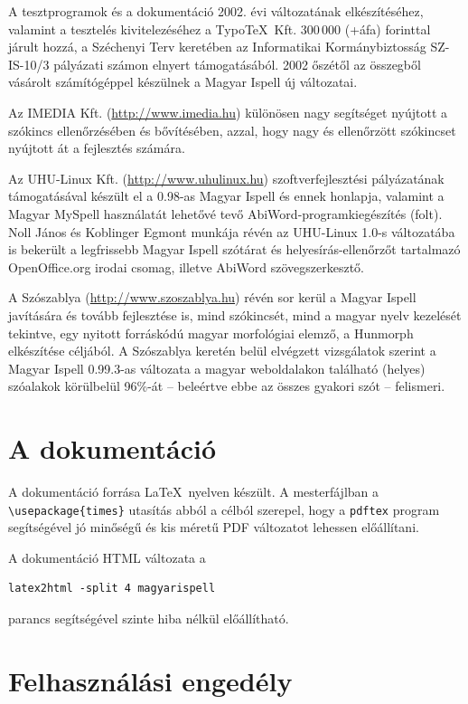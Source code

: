 A tesztprogramok és a dokumentáció 2002. évi változatának
elkészítéséhez, valamint a tesztelés kivitelezéséhez a
Typo\TeX{}\ Kft. 300\,000 (+áfa) forinttal járult hozzá,
a Széchenyi Terv keretében az Informatikai Kormánybiztosság SZ-IS-10/3
pályázati számon elnyert támogatásából. 2002 őszétől az
összegből vásárolt számítógéppel készülnek a Magyar Ispell új változatai.

Az IMEDIA Kft. (\url{http://www.imedia.hu}) különösen nagy segítséget
nyújtott a szókincs ellenőrzésében és bővítésében, azzal, hogy
nagy és ellenőrzött szókincset nyújtott át a fejlesztés számára.

Az UHU-Linux Kft. (\url{http://www.uhulinux.hu}) szoftverfejlesztési pályázatának
támogatásával készült el a 0.98-as Magyar
Ispell és ennek honlapja, valamint a Magyar MySpell használatát lehetővé tevő
AbiWord-programkiegészítés (folt). Noll János és Koblinger Egmont munkája révén az
UHU-Linux 1.0-s változatába is bekerült a legfrissebb Magyar Ispell szótárat és
helyesírás-ellenőrzőt tartalmazó OpenOffice.org irodai csomag, illetve
AbiWord szövegszerkesztő.

A Szószablya (\url{http://www.szoszablya.hu}) révén sor kerül a Magyar
Ispell javítására és tovább fejlesztése is, mind szókincsét, mind a magyar nyelv
kezelését tekintve, egy nyitott forráskódú magyar morfológiai elemző, a Hunmorph
elkészítése céljából. A Szószablya keretén belül elvégzett vizsgálatok szerint
a Magyar Ispell 0.99.3-as változata a magyar weboldalakon található (helyes)
szóalakok körülbelül 96\%-át -- beleértve ebbe az összes gyakori
szót -- felismeri.

\section{A dokumentáció}

A dokumentáció forrása \LaTeX\ nyelven készült. A mesterfájlban a
\verb+\usepackage{times}+ utasítás abból a célból szerepel, hogy a
\texttt{pdftex} program segítségével jó minőségű és kis méretű
PDF változatot lehessen előállítani.

A dokumentáció HTML változata a
\begin{verbatim}
latex2html -split 4 magyarispell
\end{verbatim}
parancs segítségével szinte hiba nélkül előállítható.

\section{Felhasználási engedély}

